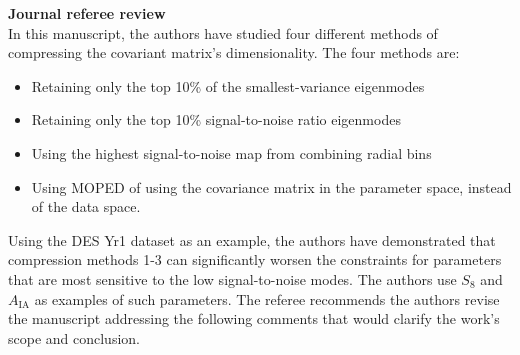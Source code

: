 \documentclass{article}
\begin{document}
	\thispagestyle{empty}
	
	\textbf{Journal referee review} \\
	
	In this manuscript, the authors have studied four different methods of compressing the covariant matrix's dimensionality. The four methods are:
	\begin{itemize}
		\item Retaining only the top 10\% of the smallest-variance eigenmodes
		\item Retaining only the top 10\% signal-to-noise ratio eigenmodes
		\item Using the highest signal-to-noise map from combining radial bins
		\item Using MOPED of using the covariance matrix in the parameter space, instead of the data space.
	\end{itemize}
	
	Using the DES Yr1 dataset as an example, the authors have demonstrated that compression methods 1-3 can significantly worsen the constraints for parameters that are most sensitive to the low signal-to-noise modes. The authors use $S_8$ and $A_{\text{IA}}$ as examples of such parameters. The referee recommends the authors revise the manuscript addressing the following comments that would clarify the work's scope and conclusion.
	
\end{document}
